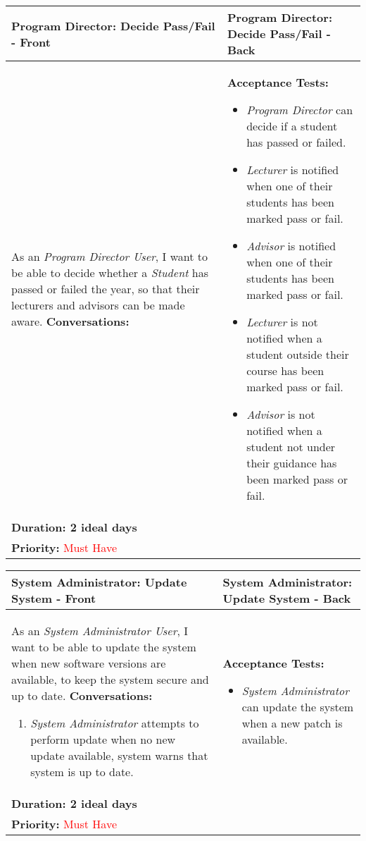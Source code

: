 \documentclass[11pt]{article}
\begin{document}
\begin{center}
\begin{tabular}{ | m{8cm}  |  m{8cm}  | } 
 \hline
 \textbf{Program Director: Decide Pass/Fail - Front} &  \textbf{Program Director: Decide Pass/Fail - Back}  \\ 
  \hline
As an \emph{Program Director User}, I want to be able to decide whether a \emph{Student} has passed or failed the year, so that their lecturers and advisors can be made aware.  \newline
\textbf{Conversations:}
& \textbf{Acceptance Tests:} 
\begin{itemize}
\item{\emph{Program Director} can decide if a student has passed or failed.}
\item{\emph{Lecturer} is notified when one of their students has been marked pass or fail.}
\item{\emph{Advisor} is notified when one of their students has been marked pass or fail.}
\item{\emph{Lecturer} is not notified when a student outside their course has been marked pass or fail.}
\item{\emph{Advisor} is not notified when a student not under their guidance has been marked pass or fail.}
\end{itemize} \\
\textbf{Duration: 2 ideal days} &\\
\textbf{Priority:}  \textcolor{red}{Must Have} & \\
 \hline
\end{tabular}
\end{center}

\begin{center}
\begin{tabular}{ | m{8cm}  |  m{8cm}  | } 
 \hline
 \textbf{System Administrator: Update System - Front} &  \textbf{System Administrator: Update System - Back}  \\ 
  \hline
As an \emph{System Administrator User}, I want to be able to update the system when new software versions are available, to keep the system secure and up to date.  \newline
\textbf{Conversations:}
\begin{enumerate}
\item{\emph{System Administrator} attempts to perform update when no new update available, system warns that system is up to date.}
\end{enumerate}
& \textbf{Acceptance Tests:} 
\begin{itemize}
\item{\emph{System Administrator} can update the system when a new patch is available.}
\end{itemize} \\
\textbf{Duration: 2 ideal days} &\\
\textbf{Priority:}  \textcolor{red}{Must Have} & \\
 \hline
\end{tabular}
\end{center}
\end{document}
